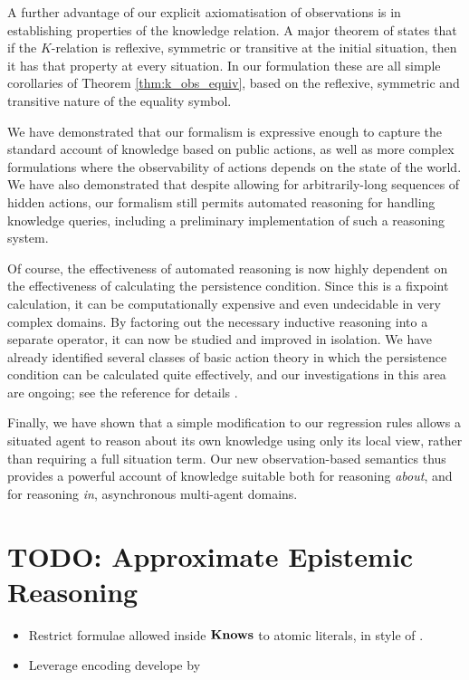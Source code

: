 A further advantage of our explicit axiomatisation of observations
is in establishing properties of the knowledge relation. A major theorem
of \citet{scherl03sc_knowledge} states that if the $K$-relation
is reflexive, symmetric or transitive at the initial situation, then
it has that property at every situation. In our formulation these
are all simple corollaries of Theorem \ref{thm:k_obs_equiv}, based
on the reflexive, symmetric and transitive nature of the equality
symbol.

We have demonstrated that our formalism is expressive enough to capture
the standard account of knowledge based on public actions, as well
as more complex formulations where the observability of actions depends
on the state of the world. We have also demonstrated that despite
allowing for arbitrarily-long sequences of hidden actions, our formalism
still permits automated reasoning for handling knowledge queries,
including a preliminary implementation of such a reasoning system.

Of course, the effectiveness of automated reasoning is now highly
dependent on the effectiveness of calculating the persistence condition.
Since this is a fixpoint calculation, it can be computationally expensive
and even undecidable in very complex domains. By factoring out the
necessary inductive reasoning into a separate operator, it can now
be studied and improved in isolation. We have already identified several
classes of basic action theory in which the persistence condition
can be calculated quite effectively, and our investigations in this
area are ongoing; see the reference for details \citep{kelly07sc_persistence}.

Finally, we have shown that a simple modification to our regression
rules allows a situated agent to reason about its own knowledge using
only its local view, rather than requiring a full situation term.
Our new observation-based semantics thus provides a powerful account
of knowledge suitable both for reasoning \emph{about}, and for reasoning
\emph{in}, asynchronous multi-agent domains.


\section{TODO: Approximate Epistemic Reasoning}

\begin{itemize}
\item Restrict formulae allowed inside $\mathbf{Knows}$ to atomic literals, in
style of \citet{demolombe00tractable_sc_belief}. 
\item Leverage encoding develope by \citet{petrick02knowledge_equivalence} 
\end{itemize}
